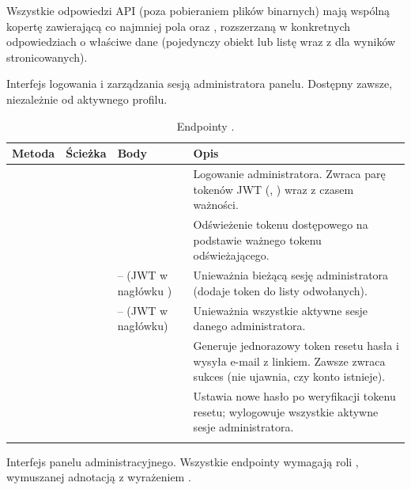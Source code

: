 Wszystkie odpowiedzi API (poza pobieraniem plików binarnych) mają wspólną kopertę
 zawierającą co najmniej pola  oraz , rozszerzaną
w konkretnych odpowiedziach o właściwe dane (pojedynczy obiekt lub listę wraz z 
dla wyników stronicowanych).


Interfejs logowania i zarządzania sesją administratora panelu. Dostępny zawsze, niezależnie od
aktywnego profilu.

\begingroup\footnotesize
\begin{longtable}{M{1.4cm} M{2.6cm} M{5.3cm} M{5.8cm}}
\toprule
{}
\textbf{Metoda} & \textbf{Ścieżka} & \textbf{Body} & \textbf{Opis} \\
\midrule
\endhead
{} &  &  &
  Logowanie administratora. Zwraca parę tokenów JWT (, ) wraz z czasem ważności. \\
 &  &  &
  Odświeżenie tokenu dostępowego na podstawie ważnego tokenu odświeżającego. \\
 &  & -- (JWT w nagłówku ) &
  Unieważnia bieżącą sesję administratora (dodaje token do listy odwołanych). \\
 &  & -- (JWT w nagłówku) &
  Unieważnia wszystkie aktywne sesje danego administratora. \\
 &  &  &
  Generuje jednorazowy token resetu hasła i wysyła e-mail z linkiem. Zawsze zwraca sukces (nie ujawnia, czy konto istnieje). \\
 &  &  &
  Ustawia nowe hasło po weryfikacji tokenu resetu; wylogowuje wszystkie aktywne sesje administratora. \\
\bottomrule
\caption{Endpointy .}
\end{longtable}
\endgroup


Interfejs panelu administracyjnego. Wszystkie endpointy wymagają roli , wymuszanej
adnotacją  z wyrażeniem .

